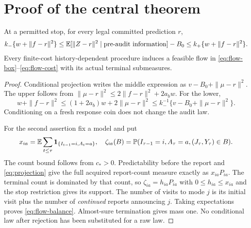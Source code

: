\section{Proof of the central theorem}
\begin{lemma}\label{lem:occupation}
At a permitted stop, for every legal committed prediction $r$,
\[
 k_-\{w+\|f-r\|^2\}\le
 \mathbb E[\|Z-r\|^2\mid\text{pre-audit information}]-B_0
 \le k_+\{w+\|f-r\|^2\}.
\]
Every finite-cost history-dependent procedure induces a feasible flow in \eqref{eq:flow-box}--\eqref{eq:flow-cost} with its actual terminal submeasures.
\end{lemma}
\begin{proof}
Conditional projection writes the middle expression as $v-B_0+\|\mu-r\|^2$. The upper follows from $\|\mu-r\|^2\le2\|f-r\|^2+2a_bw$. For the lower,
\[
 w+\|f-r\|^2\le(1+2a_b)w+2\|\mu-r\|^2
 \le k_-^{-1}\{v-B_0+\|\mu-r\|^2\}.
\]
Conditioning on a fresh response coin does not change the audit law.

For the second assertion fix a model and put
\[
 x_{ia}=\mathbb E\sum_{t\le\tau}\mathbf1_{\{I_{t-1}=i,A_t=a\}},\quad
 \zeta_{ia}(B)=\mathbb P(I_{\tau-1}=i,A_\tau=a,(J_\tau,Y_\tau)\in B).
\]
The count bound follows from $c_*>0$. Predictability before the report and \eqref{eq:projection} give the full acquired report-count measure exactly as $x_{ia}P_{ia}$. The terminal count is dominated by that count, so $\zeta_{ia}=h_{ia}P_{ia}$ with $0\le h_{ia}\le x_{ia}$ and the stop restriction gives its support. The number of visits to mode $j$ is its initial visit plus the number of \emph{continued} reports announcing $j$. Taking expectations proves \eqref{eq:flow-balance}. Almost-sure termination gives mass one. No conditional law after rejection has been substituted for a raw law.
\end{proof}

